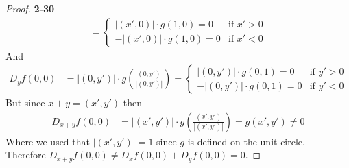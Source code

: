 \documentclass[11pt]{article}
\theoremstyle{definition}
\begin{document}
\begin{proof}{\textbf{2-30}}
\begin{align*}
    = \begin{cases}
        |(x',0)| \cdot g(1,0) = 0 & \text{if } x' > 0\\
        -|(x',0)| \cdot g(1,0) = 0 & \text{if } x' < 0
    \end{cases}
\end{align*}
And 
\begin{align*}
    D_yf(0,0) &= |(0,y')|\cdot g\left(\frac{(0,y')}{|(0,y')|}\right)
    = \begin{cases}
        |(0, y')| \cdot g(0,1) = 0 & \text{if } y' > 0\\
        -|(0, y')| \cdot g(0,1) = 0 & \text{if } y' < 0
    \end{cases}
\end{align*}
But since $x + y = (x',y')$ then
\begin{align*}
    D_{x + y}f(0,0)
    &= |(x', y')|\cdot g\left(\frac{(x', y')}{|(x',y')|}\right)
    = g(x',y') \neq 0
\end{align*}
Where we used that $|(x',y')| = 1$ since $g$ is defined on the unit circle.\\
Therefore $D_{x + y}f(0,0) \neq D_xf(0,0) + D_yf(0,0) = 0$.


\end{proof}
\end{document}
